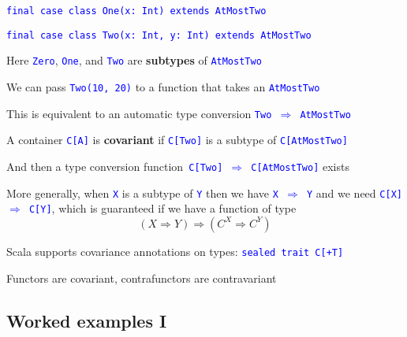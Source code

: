 \texttt{\textcolor{blue}{\footnotesize{}final case class One(x: Int)
extends AtMostTwo}}{\footnotesize\par}

\texttt{\textcolor{blue}{\footnotesize{}final case class Two(x: Int,
y: Int) extends AtMostTwo}}{\footnotesize\par}

Here \texttt{\textcolor{blue}{\footnotesize{}Zero}}, \texttt{\textcolor{blue}{\footnotesize{}One}},
and \texttt{\textcolor{blue}{\footnotesize{}Two}} are \textbf{subtypes}
of \texttt{\textcolor{blue}{\footnotesize{}AtMostTwo}}{\footnotesize\par}

We can pass \texttt{\textcolor{blue}{\footnotesize{}Two(10, 20)}}
to a function that takes an \texttt{\textcolor{blue}{\footnotesize{}AtMostTwo}}{\footnotesize\par}

This is equivalent to an automatic type conversion \texttt{\textcolor{blue}{\footnotesize{}Two
$\Rightarrow$ AtMostTwo}}{\footnotesize\par}

A container \texttt{\textcolor{blue}{\footnotesize{}C{[}A{]}}} is
\textbf{covariant} if \texttt{\textcolor{blue}{\footnotesize{}C{[}Two{]}}}
is a subtype of \texttt{\textcolor{blue}{\footnotesize{}C{[}AtMostTwo{]}}}{\footnotesize\par}

And then a type conversion function\texttt{\textcolor{blue}{\footnotesize{}
C{[}Two{]} $\Rightarrow$ C{[}AtMostTwo{]}}} exists

More generally, when \texttt{\textcolor{blue}{\footnotesize{}X}} is
a subtype of \texttt{\textcolor{blue}{\footnotesize{}Y}} then we have
\texttt{\textcolor{blue}{\footnotesize{}X $\Rightarrow$ Y}} and we
need \texttt{\textcolor{blue}{\footnotesize{}C{[}X{]} $\Rightarrow$
C{[}Y{]}}}, which is guaranteed if we have a function of type
\[
\left(X\Rightarrow Y\right)\Rightarrow(C^{X}\Rightarrow C^{Y})
\]

Scala supports covariance annotations on types: \texttt{\textcolor{blue}{\footnotesize{}sealed
trait C{[}+T{]}}}{\footnotesize\par}

Functors are covariant, contrafunctors are contravariant

\subsection{Worked examples I}

